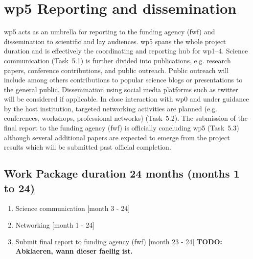 \section{\gls{wp}5 Reporting and dissemination}
\label{sec:wp5}
\gls{wp}5 acts as an umbrella for reporting to the funding agency (\gls{fwf}) and dissemination to scientific and lay audiences. \gls{wp}5 spans the whole project duration and is effectively the coordinating and reporting hub for \gls{wp}1--4. Science communication (Task~5.1) is further divided into publications, e.g. research papers, conference contributions, and public outreach. Public outreach will include among others contributions to popular science blogs or presentations to the general public. Dissemination using social media platforms such as twitter will be considered if applicable. In close interaction with \gls{wp}0 and under guidance by the host institution, targeted networking activities are planned (e.g. conferences, workshops, professional networks) (Task~5.2). The submission of the final report to the funding agency (\gls{fwf}) is officially concluding \gls{wp}5 (Task~5.3) although several additional papers are expected to emerge from the project results which will be submitted past official completion.

\subsection*{Work Package duration 24 months (months 1 to 24)}
\begin{enumerate}[start=1,label={T5.\arabic*}]
  \itemsep0pt
\item Science communication \hfill [month 3 - 24]
\item Networking \hfill [month 1 - 24]
\item Submit final report  to funding agency (\gls{fwf}) \hfill [month 23 - 24] \textbf{\color{red}TODO: Abklaeren, wann dieser faellig ist.}
\end{enumerate}
